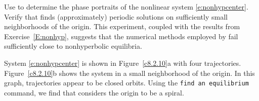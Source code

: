 \documentclass{ximera}
\begin{document}
\begin{exercise} \label{c8.2.10}
Use {\pplane} to determine the phase portraits of the nonlinear system
\eqref{e:nonhypcenter}.  Verify that {\pplane} finds (approximately) 
periodic solutions on sufficiently small neighborhoods of the origin.  This 
experiment, coupled with the results from Exercise~\ref{E:nonhyp}, suggests 
that the numerical methods employed by {\pplane} fail sufficiently close 
to nonhyperbolic equilibria.

\begin{solution}

System \eqref{e:nonhypcenter} is shown in Figure~\ref{c8.2.10}a with four
trajectories.  Figure~\ref{c8.2.10}b shows the system in a small
neighborhood of the origin.  In this graph, trajectories appear to be
closed orbits.  Using the {\tt find an equilibrium} command, we find
that \Matlab considers the origin to be a spiral.

\begin{figure}[htb]
                       \centerline{%
                       }
\end{figure}

\end{solution}
\end{exercise}
\end{document}
